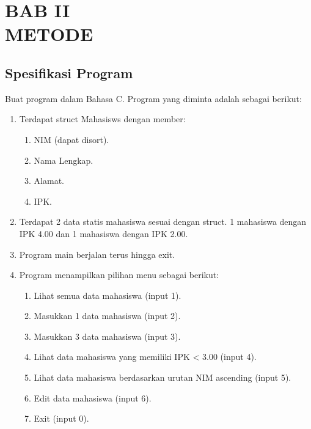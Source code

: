 \section*{\centering BAB II\\ METODE}
\subsection{Spesifikasi Program}
Buat program dalam Bahasa C. Program yang diminta adalah sebagai berikut:
\begin{enumerate}
    \item Terdapat struct Mahasisws dengan member:
    \begin{enumerate}[label=\alph*]
        \item NIM (dapat disort).
        \item Nama Lengkap.
        \item Alamat.
        \item IPK.
    \end{enumerate}
    \item Terdapat 2 data statis mahasiswa sesuai dengan struct. 1 mahasiswa dengan IPK 4.00 dan 1 mahasiswa dengan IPK 2.00.
    \item Program main berjalan terus hingga exit.
    \item Program menampilkan pilihan menu sebagai berikut:
    \begin{enumerate}[label=\alph*]
        \item Lihat semua data mahasiswa (input 1).
        \item Masukkan 1 data mahasiswa (input 2).
        \item Masukkan 3 data mahasiswa (input 3).
        \item Lihat data mahasiswa yang memiliki IPK < 3.00 (input 4).
        \item Lihat data mahasiswa berdasarkan urutan NIM ascending (input 5).
        \item Edit data mahasiswa (input 6).
        \item Exit  (input 0).
    \end{enumerate}
\end{enumerate}